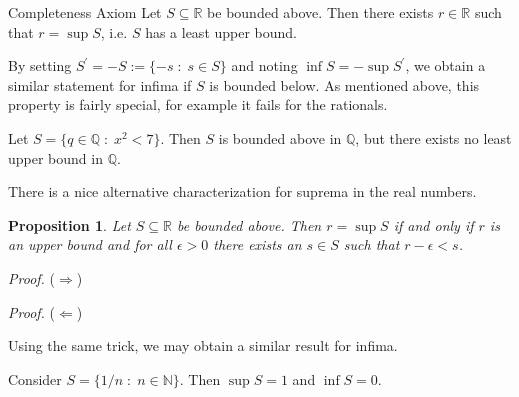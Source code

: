 \documentclass [aspectratio=169, handout]{beamer}
\newcommand{\R}{{\mathbb{R}}}
\newcommand{\N}{{\mathbb{N}}}
\newcommand{\Q}{{\mathbb{Q}}}
\newtheorem{proposition}[theorem]{Proposition}
\begin{document}
\begin{frame}


\begin{alertblock}{Completeness Axiom}
Let $S\subseteq \R$ be bounded above. Then there exists $r\in \R$ such that $r= \sup S$, i.e. $S$ has a least upper bound. 
\end{alertblock}

\vspace{1em}

By setting $S^\prime = -S:= \{ -s \; \colon \; s\in S\}$ and noting $\inf S = - \sup S^\prime$, we obtain a similar statement for infima if $S$ is bounded below. As mentioned above, this property is fairly special, for example it fails for the rationals.

\vspace{1em}

\begin{example}
Let $S= \{q \in \Q \; \colon \; x^2 < 7 \}$. Then $S$ is bounded above in $\Q$, but there exists no least upper bound in $\Q$.
\end{example}



\end{frame}

\begin{frame}
There is a nice alternative characterization for suprema in the real numbers. 

\begin{proposition}
 Let $S\subseteq \R$ be bounded above. Then $r= \sup S$ if and only if $r$ is an upper bound and for all $\epsilon>0$ there exists an $s\in S$ such that $r-\epsilon <s$. 
\end{proposition}

\textit{Proof.}
($\Rightarrow$) 
\vspace{3cm}

\end{frame}

\begin{frame}

\textit{Proof.}
($\Leftarrow$) 
\vspace{3cm}


Using the same trick, we may obtain a similar result for infima.

\vspace{1em}

\begin{example}
Consider $S = \{1/n \; \colon \; n\in \N\}$. Then $\sup S = 1$ and $\inf S = 0$.
\end{example}
\end{frame}
\end{document}
